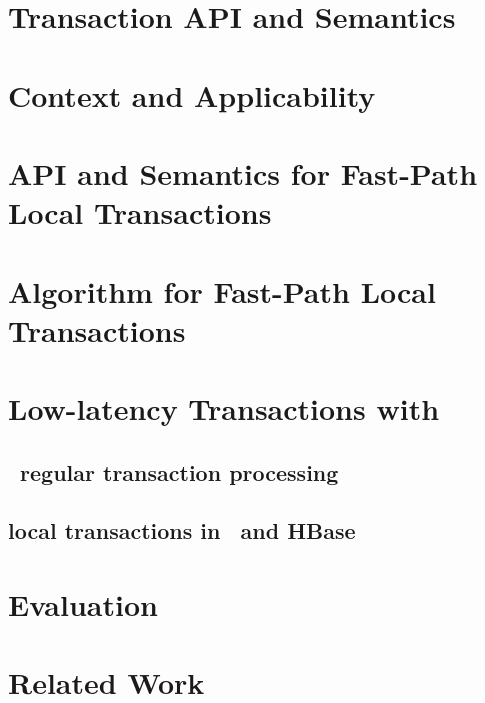 \documentclass[preprint,10pt]{sigplanconf}
\begin{document}
\section{Transaction API and Semantics} \label{sec:api}


\section{Context and Applicability} \label{sec:context}


\section{API and Semantics for Fast-Path Local Transactions} \label{sec:new-api}


\section{Algorithm for Fast-Path Local Transactions} \label{sec:alg}



\section{Low-latency Transactions with \sys} \label{sec:impl}

\subsection{\sys\ regular transaction processing}

\subsection{local transactions in \sys\ and HBase}

\section{Evaluation} \label{sec:eval}



\section{Related Work} \label{sec:related}
\end{document}
